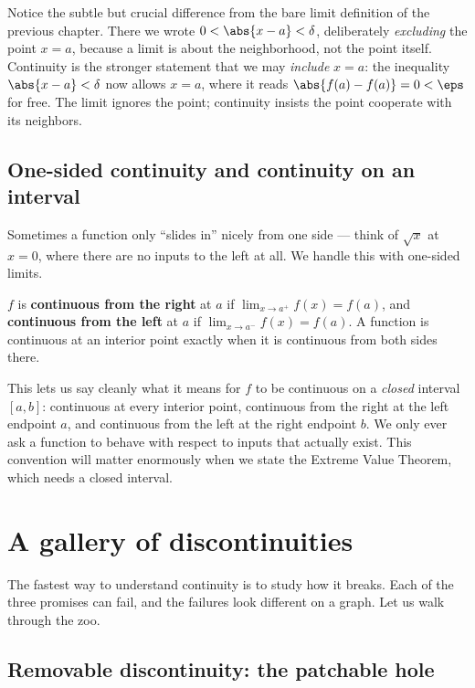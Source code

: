 \begin{focusbox}
Notice the subtle but crucial difference from the bare limit definition of the previous
chapter. There we wrote $0<\abs{x-a}<\delta$, deliberately \emph{excluding} the point
$x=a$, because a limit is about the neighborhood, not the point itself. Continuity is the
stronger statement that we may \emph{include} $x=a$: the inequality $\abs{x-a}<\delta$ now
allows $x=a$, where it reads $\abs{f(a)-f(a)}=0<\eps$ for free. The limit ignores the
point; continuity insists the point cooperate with its neighbors.
\end{focusbox}

\subsection{One-sided continuity and continuity on an interval}

Sometimes a function only ``slides in'' nicely from one side --- think of $\sqrt{x}$ at
$x=0$, where there are no inputs to the left at all. We handle this with one-sided
limits.

\begin{definition}
\label{ch08:def-onesided}
$f$ is \textbf{continuous from the right} at $a$ if $\lim_{x\to a^+} f(x)=f(a)$, and
\textbf{continuous from the left} at $a$ if $\lim_{x\to a^-} f(x)=f(a)$. A function is
continuous at an interior point exactly when it is continuous from both sides there.
\end{definition}

This lets us say cleanly what it means for $f$ to be continuous on a \emph{closed}
interval $[a,b]$: continuous at every interior point, continuous from the right at the
left endpoint $a$, and continuous from the left at the right endpoint $b$. We only ever
ask a function to behave with respect to inputs that actually exist. This convention will
matter enormously when we state the Extreme Value Theorem, which needs a closed interval.

\section{A gallery of discontinuities}
\label{ch08:gallery}

The fastest way to understand continuity is to study how it breaks. Each of the three
promises can fail, and the failures look different on a graph. Let us walk through the
zoo.

\subsection{Removable discontinuity: the patchable hole}

